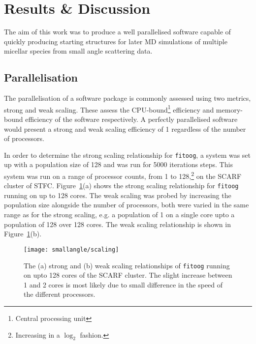 \section{Results \& Discussion}
The aim of this work was to produce a well parallelised software capable of quickly producing starting structures for later MD simulations of multiple micellar species from small angle scattering data.

\subsection{Parallelisation}
The parallelisation of a software package is commonly assessed using two metrics, strong and weak scaling.
These assess the CPU-bound\footnote{Central processing unit} efficiency and memory-bound efficiency of the software respectively.
A perfectly parallelised software would present a strong and weak scaling efficiency of 1 regardless of the number of processors.

In order to determine the strong scaling relationship for \texttt{fitoog}, a system was set up with a population size of 128 and was run for 5000 iterations steps.
This system was run on a range of processor counts, from 1 to 128,\footnote{Increasing in a $\log_2$ fashion.} on the SCARF cluster of STFC.
Figure~\ref{fig:scale}(a) shows the strong scaling relationship for \texttt{fitoog} running on up to 128 cores.
The weak scaling was probed by increasing the population size alongside the number of processors, both were varied in the same range as for the strong scaling, e.g. a population of 1 on a single core upto a population of 128 over 128 cores.
The weak scaling relationship is shown in Figure~\ref{fig:scale}(b).
%
\begin{figure}
    \centering
    \texttt{[image: smallangle/scaling]}
    \caption{The (a) strong and (b) weak scaling relationships of \texttt{fitoog} running on upto 128 cores of the SCARF cluster. The slight increase between \num{1} and \num{2} cores is most likely due to small difference in the speed of the different processors.}
    \label{fig:scale}
\end{figure}
%

